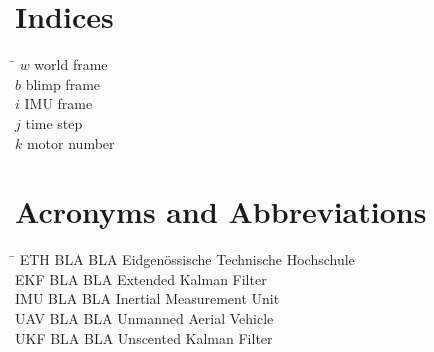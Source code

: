 \section*{Indices}
\begin{tabbing}
 \hspace*{1.6cm}  \= \kill
 $w$ \> world frame \\[0.5ex]
 $b$ \> blimp frame \\[0.5ex]
 $i$ \> IMU frame \\[0.5ex]
 $j$ \> time step \\[0.5ex]
 $k$ \> motor number \\[0.5ex]
\end{tabbing}

\section*{Acronyms and Abbreviations}
\begin{tabbing}
 \hspace*{1.6cm}  \= \kill
 ETH \> BLA BLA Eidgenössische Technische Hochschule \\[0.5ex]
 EKF \> BLA BLA Extended Kalman Filter \\[0.5ex]
 IMU \> BLA BLA Inertial Measurement Unit \\[0.5ex]
 UAV \> BLA BLA Unmanned Aerial Vehicle \\[0.5ex]
 UKF \> BLA BLA Unscented Kalman Filter \\[0.5ex]
\end{tabbing}